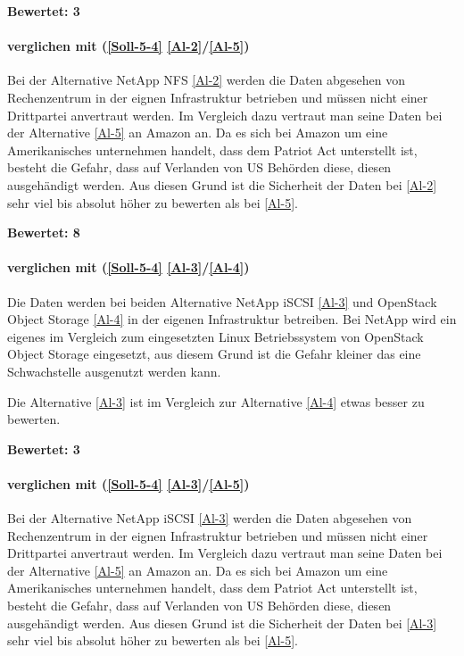 \textbf{Bewertet: 3}

\paragraph*{  verglichen mit  (\ref{Soll-5-4} \ref{Al-2}/\ref{Al-5})}
Bei der Alternative NetApp NFS \ref{Al-2} werden die Daten abgesehen von Rechenzentrum in der eignen Infrastruktur betrieben und müssen nicht einer Drittpartei anvertraut werden. Im Vergleich dazu vertraut man seine Daten bei der Alternative \ref{Al-5} an Amazon an. Da es sich bei Amazon um eine Amerikanisches unternehmen handelt, dass dem Patriot Act unterstellt ist, besteht die Gefahr, dass auf Verlanden von US Behörden diese, diesen ausgehändigt werden. Aus diesen Grund ist die Sicherheit der Daten bei  \ref{Al-2} sehr viel bis absolut höher zu bewerten als bei  \ref{Al-5}.

\textbf{Bewertet: 8}

\paragraph*{  verglichen mit  (\ref{Soll-5-4} \ref{Al-3}/\ref{Al-4})}
Die Daten werden bei beiden Alternative NetApp iSCSI \ref{Al-3} und OpenStack Object Storage \ref{Al-4} in der eigenen Infrastruktur betreiben. Bei NetApp wird ein eigenes im Vergleich zum eingesetzten Linux Betriebssystem von OpenStack Object Storage eingesetzt, aus diesem Grund ist die Gefahr kleiner das eine Schwachstelle ausgenutzt werden kann.

Die Alternative  \ref{Al-3} ist im Vergleich zur Alternative  \ref{Al-4} etwas besser zu bewerten.

\textbf{Bewertet: 3}

\paragraph*{  verglichen mit  (\ref{Soll-5-4} \ref{Al-3}/\ref{Al-5})}
Bei der Alternative NetApp iSCSI \ref{Al-3} werden die Daten abgesehen von Rechenzentrum in der eignen Infrastruktur betrieben und müssen nicht einer Drittpartei anvertraut werden. Im Vergleich dazu vertraut man seine Daten bei der Alternative \ref{Al-5} an Amazon an. Da es sich bei Amazon um eine Amerikanisches unternehmen handelt, dass dem Patriot Act unterstellt ist, besteht die Gefahr, dass auf Verlanden von US Behörden diese, diesen ausgehändigt werden. Aus diesen Grund ist die Sicherheit der Daten bei  \ref{Al-3} sehr viel bis absolut höher zu bewerten als bei  \ref{Al-5}.

